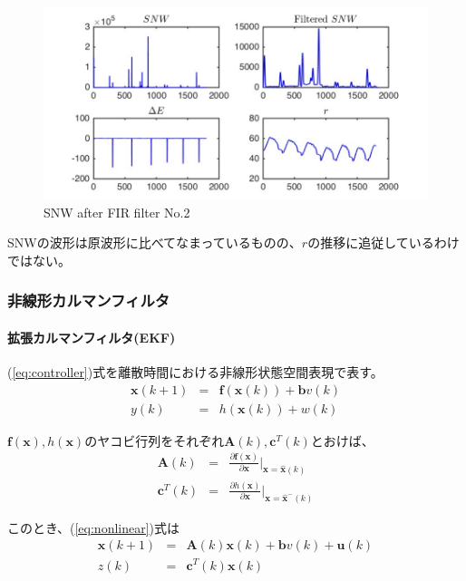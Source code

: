 \documentclass[twocolumn,oneside,a4paper]{article}
\begin{document}
\begin{figure}[htbp]
    \includegraphics[bb=0 0 432 216,width=1\columnwidth]{snw_filtered.pdf}
    \caption{SNW after FIR filter No.2}
   \label{fig:filtered2}
\end{figure}


SNWの波形は原波形に比べてなまっているものの、$r$の推移に追従しているわけではない。


\subsubsection{非線形カルマンフィルタ}
\paragraph{拡張カルマンフィルタ(EKF)}
(\ref{eq:controller})式を離散時間における非線形状態空間表現で表す。
\begin{eqnarray*}\label{eq:nonlinear}
\bm{x}(k+1) &=& \bm{f}(\bm{x}(k))+\bm{b}v(k)\\
y(k) &=& h(\bm{x}(k))+w(k)
\end{eqnarray*}

$\bm{f}(\bm{x}), h(\bm{x})$のヤコビ行列をそれぞれ$\bm{A}(k), \bm{c}^T(k)$とおけば、
\begin{eqnarray*}
\bm{A}(k) &=& \frac{\partial \bm{f}(\bm{x})}{\partial \bm{x}} \bigg| _{\bm{x}=\hat{\bm{x}}(k)}\\
\bm{c}^T(k) &=& \frac{\partial h(\bm{x})}{\partial \bm{x} } \bigg| _{\bm{x}=\hat{\bm{x}}^{-}(k)}
\end{eqnarray*}


このとき、(\ref{eq:nonlinear})式は
\begin{eqnarray*}
\bm{x}(k+1) &=& \bm{A}(k)\bm{x}(k) + \bm{b}v(k)+\bm{u}(k)\\
z(k) &=& \bm{c}^T(k)\bm{x}(k)
\end{eqnarray*}
\end{document}
